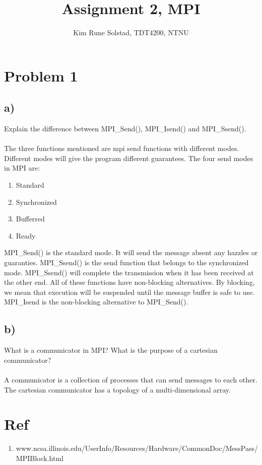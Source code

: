 \documentclass[a4paper, 11pt, english]{article}
\author{Kim Rune Solstad, TDT4200, NTNU}
\title{Assignment 2, MPI}
\begin{document}
\maketitle
\section{Problem 1}
\subsection{a)}
Explain the difference between MPI\_Send(), MPI\_Isend() and MPI\_Ssend().
\\
\\
The three functions mentioned are mpi send functions with different modes. Different modes will give the program different guarantees. The four send modes in MPI are:
\begin{enumerate}
	\item Standard
	\item Synchronized
	\item Bufferred
	\item Ready
\end{enumerate}

MPI\_Send() is the standard mode. It will send the message absent any hazzles or guaranties. MPI\_Ssend() is the send function that belongs to the synchronized mode. MPI\_Ssend() will complete the transmission when it has been received at the other end. All of these functions have non-blocking alternatives. By blocking, we mean that execution will be suspended until the message buffer is safe to use. MPI\_Isend is the non-blocking alternative to MPI\_Send(). 
\subsection{b)}
What is a communicator in MPI? What is the purpose of a cartesian communicator?
\\\\
A communicator is a collection of processes that can send messages to each other. The cartesian communicator has a topology of a multi-dimensional array.
\section*{Ref}
\begin{enumerate}
	\item www.ncsa.illinois.edu/UserInfo/Resources/Hardware/CommonDoc/MessPass/MPIBlock.html
\end{enumerate}
\end{document}
